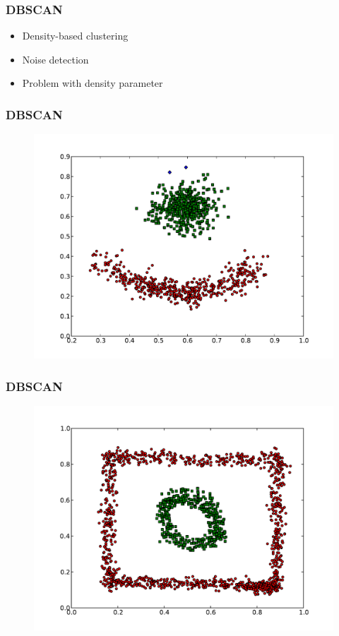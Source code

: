 \documentclass{beamer}
\begin{document}
\begin{frame}
\frametitle{DBSCAN}
    \begin{itemize}
	\item Density-based clustering
    	\item Noise detection
   	\item Problem with density parameter
    \end{itemize}
\end{frame}

\begin{frame}
\frametitle{DBSCAN}
    \begin{figure}[]
    \includegraphics[scale=0.3]{dbscan_red-blue-clusters.pdf}
    \end{figure}
\end{frame}

\begin{frame}
\frametitle{DBSCAN}
    \begin{figure}[]
    \includegraphics[scale=0.3]{dbscan_circle-weird.pdf}
    \end{figure}
\end{frame}
\end{document}
